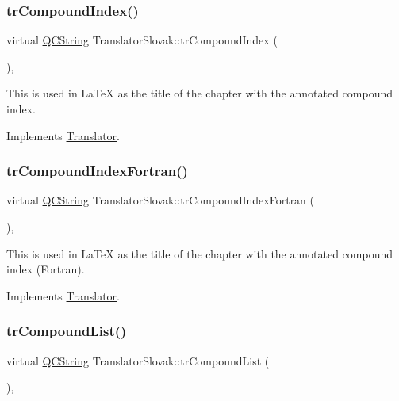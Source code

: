 \subsubsection{\texorpdfstring{trCompoundIndex()}{trCompoundIndex()}}
{\footnotesize\ttfamily virtual \mbox{\hyperlink{class_q_c_string}{Q\+C\+String}} Translator\+Slovak\+::tr\+Compound\+Index (\begin{DoxyParamCaption}{ }\end{DoxyParamCaption})\hspace{0.3cm}{\ttfamily [inline]}, {\ttfamily [virtual]}}

This is used in La\+TeX as the title of the chapter with the annotated compound index. 

Implements \mbox{\hyperlink{class_translator}{Translator}}.

\mbox{\label{class_translator_slovak_abd3f486285cbb1f20d1f7d93b91ba896}} 
\subsubsection{\texorpdfstring{trCompoundIndexFortran()}{trCompoundIndexFortran()}}
{\footnotesize\ttfamily virtual \mbox{\hyperlink{class_q_c_string}{Q\+C\+String}} Translator\+Slovak\+::tr\+Compound\+Index\+Fortran (\begin{DoxyParamCaption}{ }\end{DoxyParamCaption})\hspace{0.3cm}{\ttfamily [inline]}, {\ttfamily [virtual]}}

This is used in La\+TeX as the title of the chapter with the annotated compound index (Fortran). 

Implements \mbox{\hyperlink{class_translator}{Translator}}.

\mbox{\label{class_translator_slovak_ac832c40383660a1e9c5ad3329873b22a}} 
\subsubsection{\texorpdfstring{trCompoundList()}{trCompoundList()}}
{\footnotesize\ttfamily virtual \mbox{\hyperlink{class_q_c_string}{Q\+C\+String}} Translator\+Slovak\+::tr\+Compound\+List (\begin{DoxyParamCaption}{ }\end{DoxyParamCaption})\hspace{0.3cm}{\ttfamily [inline]}, {\ttfamily [virtual]}}

